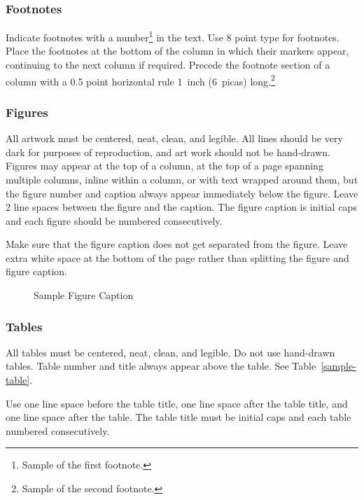 \documentclass[twoside]{article}
\begin{document}
\subsubsection{Footnotes}

Indicate footnotes with a number\footnote{Sample of the first
  footnote.} in the text. Use 8 point type for footnotes. Place the
footnotes at the bottom of the column in which their markers appear,
continuing to the next column if required. Precede the footnote
section of a column with a 0.5 point horizontal rule 1~inch (6~picas)
long.\footnote{Sample of the second footnote.}

\subsubsection{Figures}

All artwork must be centered, neat, clean, and legible.  All lines
should be very dark for purposes of reproduction, and art work should
not be hand-drawn.  Figures may appear at the top of a column, at the
top of a page spanning multiple columns, inline within a column, or
with text wrapped around them, but the figure number and caption
always appear immediately below the figure.  Leave 2 line spaces
between the figure and the caption. The figure caption is initial caps
and each figure should be numbered consecutively.

Make sure that the figure caption does not get separated from the
figure. Leave extra white space at the bottom of the page rather than
splitting the figure and figure caption.
\begin{figure}[h]
\vspace{.3in}
\centerline{}
\vspace{.3in}
\caption{Sample Figure Caption}
\end{figure}

\subsubsection{Tables}

All tables must be centered, neat, clean, and legible. Do not use hand-drawn tables.
Table number and title always appear above the table.
See Table~\ref{sample-table}.

Use one line space before the table title, one line space after the table title,
and one line space after the table. The table title must be
initial caps and each table numbered consecutively.
\end{document}
